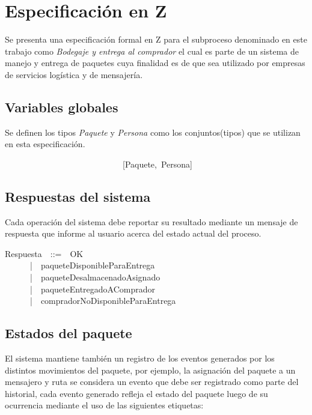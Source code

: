 \documentclass[12pt,a4paper]{article}
\begin{document}
\newpage
\section{Especificación en Z}

Se presenta una especificación formal en Z para el subproceso denominado en este trabajo como \textit{Bodegaje y entrega al comprador} el cual es parte de un sistema de manejo y entrega de paquetes cuya finalidad es de que sea utilizado por empresas de servicios logística y de mensajería.  

\subsection{Variables globales}
Se definen los tipos \textit{Paquete} y \textit{Persona}  como los conjuntos(tipos) que se utilizan en esta especificación. 

\begin{zed}
~~~~~~~~~~~~~~~~~~~~~~~~~~~~[Paquete,~Persona]
\end{zed}

\subsection{Respuestas del sistema}

Cada operación del sistema debe reportar su resultado mediante un mensaje de respuesta que informe al usuario acerca del estado actual del proceso.

\begin{zed}
Respuesta~~::=~~OK\\
~~~~~~|~~paqueteDisponibleParaEntrega\\
~~~~~~|~~paqueteDesalmacenadoAsignado\\
~~~~~~|~~paqueteEntregadoAComprador\\
~~~~~~|~~compradorNoDisponibleParaEntrega\\
\end{zed}

\subsection{Estados del paquete}
\indent El sistema mantiene también un registro de los eventos generados por los distintos movimientos del paquete, por ejemplo, la asignación del paquete a un mensajero y ruta se considera un evento que debe ser registrado como parte del historial, cada evento generado refleja el estado del paquete luego de su ocurrencia mediante el uso de las siguientes etiquetas:
\end{document}
